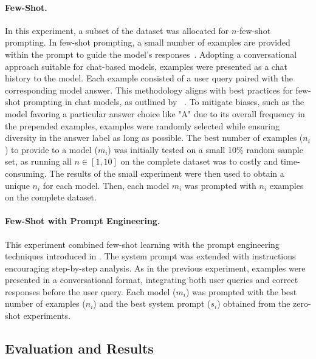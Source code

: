 \paragraph{Few-Shot.}
\label{few-shot-prompt}
In this experiment, a subset of the dataset was allocated for $n$-few-shot prompting. In few-shot prompting, a small number of examples are provided within the prompt to guide the model's responses~\cite{brownLanguageModelsAre2020}. Adopting a conversational approach suitable for chat-based models, examples were presented as a chat history to the model. Each example consisted of a user query paired with the corresponding model answer. This methodology aligns with best practices for few-shot prompting in chat models, as outlined by ~\cite{HowUseFew}. To mitigate biases, such as the model favoring a particular answer choice like "A" due to its overall frequency in the prepended examples, examples were randomly selected while ensuring diversity in the answer label as long as possible. The best number of examples ($n_i$) to provide to a model ($m_i$) was initially tested on a small 10\% random sample set, as running all $n \in [1, 10]$ on the complete dataset was to costly and time-consuming. The results of the small experiment were then used to obtain a unique $n_i$ for each model. Then, each model $m_i$ was prompted with $n_i$ examples on the complete dataset.

\paragraph{Few-Shot with Prompt Engineering.}
This experiment combined few-shot learning with the prompt engineering techniques introduced in . The system prompt was extended with instructions encouraging step-by-step analysis. As in the previous  experiment, examples were presented in a conversational format, integrating both user queries and correct responses before the user query. Each model ($m_i$) was prompted with the best number of examples ($n_i$) and the best system prompt ($s_i$) obtained from the zero-shot experiments.

\subsection{Evaluation and Results}
